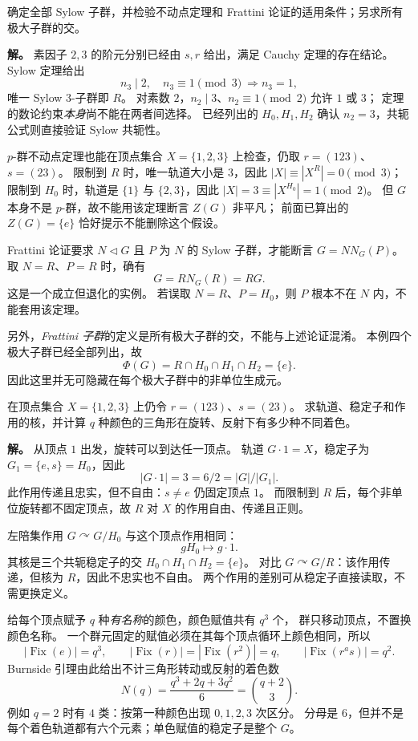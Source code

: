\begin{workedexample}
\label{ex:d3-comprehensive-sylow}
确定全部 Sylow 子群，并检验不动点定理和 Frattini 论证的适用条件；另求所有极大子群的交。

\textbf{解。} 素因子 $2,3$ 的阶元分别已经由 $s,r$ 给出，满足 Cauchy 定理的存在结论。
Sylow 定理给出
\[
n_3\mid2,\quad n_3\equiv1\pmod3\ \Longrightarrow n_3=1,
\]
唯一 Sylow $3$-子群即 $R$。
对素数 $2$，$n_2\mid3$、$n_2\equiv1\pmod2$ 允许 $1$ 或 $3$；
定理的数论约束\emph{本身}尚不能在两者间选择。
已经列出的 $H_0,H_1,H_2$ 确认 $n_2=3$，共轭公式则直接验证 Sylow 共轭性。

$p$-群不动点定理也能在顶点集合 $X=\{1,2,3\}$ 上检查，仍取 $r=(123)$、$s=(23)$。
限制到 $R$ 时，唯一轨道大小是 $3$，因此 $|X|\equiv|X^R|=0\pmod3$；
限制到 $H_0$ 时，轨道是 $\{1\}$ 与 $\{2,3\}$，因此
$|X|=3\equiv |X^{H_0}|=1\pmod2$。
但 $G$ 本身不是 $p$-群，故不能用该定理断言 $Z(G)$ 非平凡；
前面已算出的 $Z(G)=\{e\}$ 恰好提示不能删除这个假设。

Frattini 论证要求 $N\lhd G$ 且 $P$ 为 $N$ 的 Sylow 子群，才能断言
$G=N N_G(P)$。
取 $N=R$、$P=R$ 时，确有
\[
G=R N_G(R)=RG.
\]
这是一个成立但退化的实例。
若误取 $N=R$、$P=H_0$，则 $P$ 根本不在 $N$ 内，不能套用该定理。

另外，\emph{Frattini 子群}的定义是所有极大子群的交，不能与上述论证混淆。
本例四个极大子群已经全部列出，故
\[
\Phi(G)=R\cap H_0\cap H_1\cap H_2=\{e\}.
\]
因此这里并无可隐藏在每个极大子群中的非单位生成元。
\end{workedexample}

\begin{workedexample}
\label{ex:d3-comprehensive-actions}
在顶点集合 $X=\{1,2,3\}$ 上仍令 $r=(123)$、$s=(23)$。
求轨道、稳定子和作用的核，并计算 $q$ 种颜色的三角形在旋转、反射下有多少种不同着色。

\textbf{解。} 从顶点 $1$ 出发，旋转可以到达任一顶点。
轨道 $G\cdot1=X$，稳定子为 $G_1=\{e,s\}=H_0$，因此
\[
|G\cdot1|=3=6/2=|G|/|G_1|.
\]
此作用传递且忠实，但不自由：$s\ne e$ 仍固定顶点 $1$。
而限制到 $R$ 后，每个非单位旋转都不固定顶点，故 $R$ 对 $X$ 的作用自由、传递且正则。

左陪集作用 $G\curvearrowright G/H_0$ 与这个顶点作用相同：
\[
gH_0\longmapsto g\cdot1.
\]
其核是三个共轭稳定子的交 $H_0\cap H_1\cap H_2=\{e\}$。
对比 $G\curvearrowright G/R$：该作用传递，但核为 $R$，因此不忠实也不自由。
两个作用的差别可从稳定子直接读取，不需更换定义。

给每个顶点赋予 $q$ 种\emph{有名称}的颜色，颜色赋值共有 $q^3$ 个，
群只移动顶点，不置换颜色名称。
一个群元固定的赋值必须在其每个顶点循环上颜色相同，所以
\[
|\operatorname{Fix}(e)|=q^3,\qquad
|\operatorname{Fix}(r)|=|\operatorname{Fix}(r^2)|=q,\qquad
|\operatorname{Fix}(r^a s)|=q^2.
\]
Burnside 引理由此给出不计三角形转动或反射的着色数
\[
N(q)=\frac{q^3+2q+3q^2}{6}=\binom{q+2}{3}.
\]
例如 $q=2$ 时有 $4$ 类：按第一种颜色出现 $0,1,2,3$ 次区分。
分母是 $6$，但并不是每个着色轨道都有六个元素；单色赋值的稳定子是整个 $G$。
\end{workedexample}

